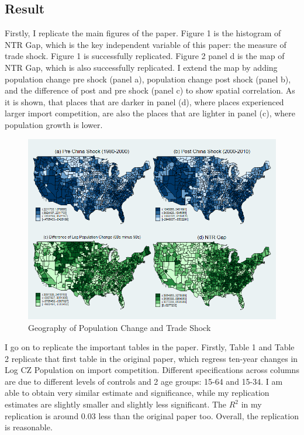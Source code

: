 \documentclass[12pt, final]{CSP}
\begin{document}
\subsection{Result}
Firstly, I replicate the main figures of the paper. Figure 1 is the histogram of NTR Gap, which is the key independent variable of this paper: the measure of trade shock. Figure 1 is successfully replicated. 
\newline
\newline
Figure 2 panel d is the map of NTR Gap, which is also successfully replicated. I extend the map by adding population change pre shock (panel a), population change post shock (panel b), and the difference of post and pre shock (panel c) to show spatial correlation. As it is shown, that places that are darker in panel (d), where places experienced larger import competition, are also the places that are lighter in panel (c), where population growth is lower. 
\newline
\newline
\begin{figure}[h]
\caption{Geography of Population Change and Trade Shock}
\centering
\includegraphics[width=1\textwidth]{popNTR}
\end{figure}
\newline
\newline
I go on to replicate the important tables in the paper. Firstly, Table 1 and Table 2 replicate that first table in the original paper, which regress ten-year changes in Log CZ Population on import competition. Different specifications across columns are due to different levels of controls and 2 age groups: 15-64 and 15-34. I am able to obtain very similar estimate and significance, while my replication estimates are slightly smaller and slightly less significant. The $R^2$ in my replication is around 0.03 less than the original paper too. Overall, the replication is reasonable. 
\newline
\newline
\end{document}
